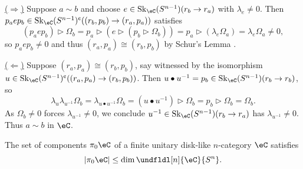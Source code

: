 \documentclass[12pt,reqno]{amsart}
\newcommand{\Sk}{\mathrm{Sk}}
\newcommand{\C}{\eC}
\newcommand{\blt}{\bullet}
\newcommand{\cent}{\textup{\textcent}}
\newcommand{\itemstep}[1]{\smallskip\noindent\underline{#1}}
\begin{document}
\begin{pf}
\itemstep{($\Rightarrow$)} Suppose $a\sim b$ and choose $e\in\Sk_\C(S^{n-1})(r_b\to r_a)$ with $\lambda_{e} \neq 0$. Then $p_a e p_b \in \Sk_\C(S^{n-1})^\cent((r_b, p_b) \to (r_a, p_a))$ satisfies
\[
(p_a e p_b) \triangleright \Omega_b = p_a \triangleright(e \triangleright (p_b\triangleright\Omega_b)) = p_a\triangleright(\lambda_e\Omega_a)=\lambda_e\Omega_a \neq 0,
\]
so $p_a e p_b \neq 0$ and thus $(r_a, p_a) \cong (r_b, p_b)$ by Schur's Lemma \cite[Lem. 7.10.5]{UQSL}.

\itemstep{($\Leftarrow$)} Suppose $(r_a,p_a)\cong(r_b,p_b)$, say witnessed by the isomorphism $u\in\Sk_\C(S^{n-1})^\cent((r_a,p_a)\to (r_b,p_b))$. Then $u\blt u^{-1}=p_b\in\Sk_\C(S^{n-1})(r_b\to r_b)$, so
\[
\lambda_u\lambda_{u^{-1}}\Omega_b = \lambda_{u\blt u^{-1}}\Omega_b = (u\blt u^{-1})\triangleright\Omega_b = p_b\triangleright\Omega_b = \Omega_b.
\]
As $\Omega_b\neq 0$ forces $\lambda_{u^{-1}}\neq 0$, we conclude $u^{-1}\in\Sk_\C(S^{n-1})(r_b\to r_a)$ has $\lambda_{u^{-1}}\neq0$. Thus $a\sim b$ in $\C$.
\end{pf}

\begin{proposition}
\label{thm:finiteness-components}
The set of components $\pi_0\C$ of a finite unitary disk-like $n$-category $\C$ satisfies
\[
|\pi_0\C|\leq\dim \undfldl[n]{\C}{S^n}.
\]
\end{proposition}
\end{document}
